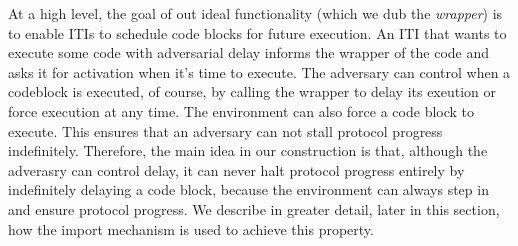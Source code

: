 

At a high level, the goal of out ideal functionality (which we dub the \textit{wrapper}) is to enable ITIs to schedule code blocks for future execution.
An ITI that wants to execute some code with adversarial delay informs the wrapper of the code and asks it for activation when it's time to execute.
The adversary can control when a codeblock is executed, of course, by calling the wrapper to delay its exeution or force execution at any time.
The environment can also force a code block to execute.
This ensures that an adversary can not stall protocol progress indefinitely.
Therefore, the main idea in our construction is that, although the adverasry can control delay, it can never halt protocol progress entirely by indefinitely delaying a code block, because the environment can always step in and ensure protocol progress.
We describe in greater detail, later in this section, how the import mechanism is used to achieve this property.

